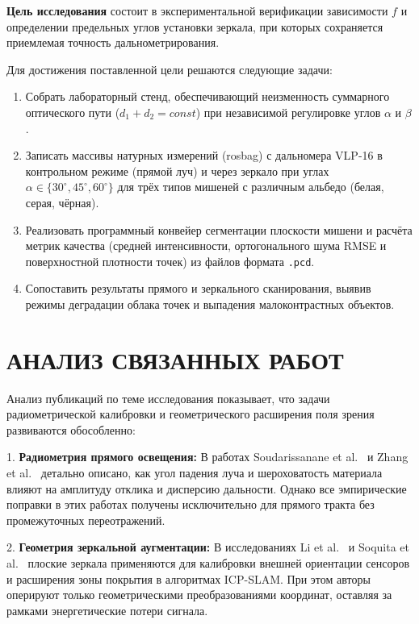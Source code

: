 \documentclass{misisarticle}
\begin{document}
\textbf{Цель исследования} состоит в экспериментальной верификации зависимости $f$ и определении предельных углов установки зеркала, при которых сохраняется приемлемая точность дальнометрирования.

Для достижения поставленной цели решаются следующие задачи:
\begin{enumerate}
    \item Собрать лабораторный стенд, обеспечивающий неизменность суммарного оптического пути ($d_1 + d_2 = const$) при независимой регулировке углов $\alpha$ и $\beta$.
    \item Записать массивы натурных измерений (rosbag) с дальномера VLP-16 в контрольном режиме (прямой луч) и через зеркало при углах $\alpha \in \{30^\circ, 45^\circ, 60^\circ\}$ для трёх типов мишеней с различным альбедо (белая, серая, чёрная).
    \item Реализовать программный конвейер сегментации плоскости мишени и расчёта метрик качества (средней интенсивности, ортогонального шума RMSE и поверхностной плотности точек) из файлов формата \texttt{.pcd}.
    \item Сопоставить результаты прямого и зеркального сканирования, выявив режимы деградации облака точек и выпадения малоконтрастных объектов.
\end{enumerate}

\section{АНАЛИЗ СВЯЗАННЫХ РАБОТ}

Анализ публикаций по теме исследования показывает, что задачи радиометрической калибровки и геометрического расширения поля зрения развиваются обособленно:

1. \textbf{Радиометрия прямого освещения:} В работах Soudarissanane et al.~\cite{soudarissanane2009} и Zhang et al.~\cite{zhang2023} детально описано, как угол падения луча и шероховатость материала влияют на амплитуду отклика и дисперсию дальности. Однако все эмпирические поправки в этих работах получены исключительно для прямого тракта без промежуточных переотражений.

2. \textbf{Геометрия зеркальной аугментации:} В исследованиях Li et al.~\cite{li2021} и Soquita et al.~\cite{soquita2025} плоские зеркала применяются для калибровки внешней ориентации сенсоров и расширения зоны покрытия в алгоритмах ICP-SLAM. При этом авторы оперируют только геометрическими преобразованиями координат, оставляя за рамками энергетические потери сигнала.
\end{document}
